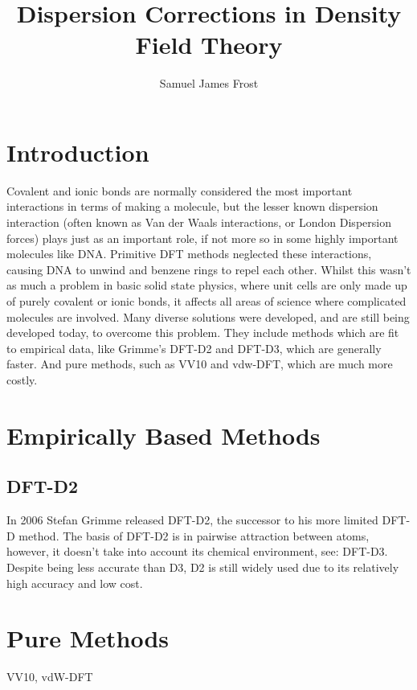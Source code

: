 \documentclass[10pt,a4paper,twocolumn,twoside]{extarticle}
\title{Dispersion Corrections in Density Field Theory}
\author{Samuel James Frost}
\begin{document}
	\thispagestyle{empty}
	\twocolumn[
	\begin{@twocolumnfalse}
		\begin{center}
			\vspace*{-10mm}
			{\Large\scshape\papertitle}\\
			\vspace{2ex}
			{\itshape\paperauthor}
		\end{center}
		\centering\noindent\rule{0.9\textwidth}{0.4pt}
		\begin{abstract}
			{\lipsum[5]}
		\end{abstract}
		\centering\noindent\rule{0.9\textwidth}{0.4pt}\\
		\vspace{1cm}
	\end{@twocolumnfalse}]
	\tableofcontents

	
	\section{Introduction}
	Covalent and ionic bonds are normally considered the most important interactions in terms of making a molecule, but the lesser known dispersion interaction (often known as Van der Waals interactions, or London Dispersion forces) plays just as an important role, if not more so in some highly important molecules like DNA.
	Primitive DFT methods neglected these interactions, causing DNA to unwind and benzene rings to repel each other. Whilst this wasn't as much a problem in basic solid state physics, where unit cells are only made up of purely covalent or ionic bonds, it affects all areas of science where complicated molecules are involved. 
	Many diverse solutions were developed, and are still being developed today, to overcome this problem. They include methods which are fit to empirical data, like Grimme's DFT-D2 and DFT-D3, which are generally faster. And pure methods, such as VV10 and vdw-DFT, which are much more costly.


	\section{Empirically Based Methods}
	\subsection{DFT-D2}
	In 2006 Stefan Grimme released DFT-D2\cite{Grimme2006}, 
	the successor to his more limited DFT-D method.
	The basis of DFT-D2 is in pairwise attraction between atoms, however, it doesn't take into account its chemical environment, see: DFT-D3. Despite being less accurate than D3, D2 is still widely used due to its relatively high accuracy and low cost.


	\section{Pure Methods}
	VV10, vdW-DFT

	\newpage
	\printbibliography
\end{document}
